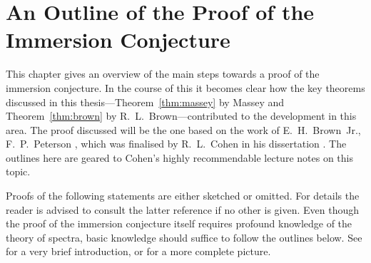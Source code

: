 % 

\chapter
{An Outline of the Proof of the Immersion Conjecture}
\label{chap:outlook}

This chapter gives an overview of the main steps towards a proof 
of the immersion conjecture.
In the course of this it becomes clear how the key theorems discussed
in this thesis---Theorem~\ref{thm:massey} by Massey and
Theorem~\ref{thm:brown} by R.~L.~Brown---contributed to the
development in this area.
The proof discussed will be the one based on the work of
E.~H.~Brown~Jr., F.~P.~Peterson \cite{brownpeterson}, which was
finalised by R.~L.~Cohen in his dissertation \cite{cohen}. The
outlines here are geared to Cohen's highly recommendable lecture notes
\cite{immersionconj} on this topic.

Proofs of the following statements are either sketched or omitted. For
details the reader is advised to consult the latter reference if no
other is given. Even though the proof of the immersion conjecture
itself requires profound knowledge of the theory of spectra, basic
knowledge should suffice to follow the outlines below. See
\cite[p.~77ff]{immersionconj} for a very brief introduction, or
\cite{switzer} for a more complete picture.


